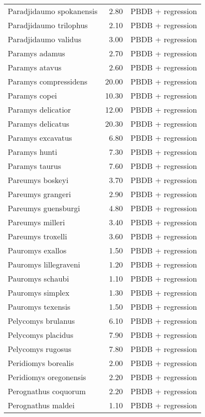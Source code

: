 \begin{table}[ht]
\begin{tabular}{lrl}
  Paradjidaumo spokanensis & 2.80 & PBDB + regression \\ 
  Paradjidaumo trilophus & 2.10 & PBDB + regression \\ 
  Paradjidaumo validus & 3.00 & PBDB + regression \\ 
  Paramys adamus & 2.70 & PBDB + regression \\ 
  Paramys atavus & 2.60 & PBDB + regression \\ 
  Paramys compressidens & 20.00 & PBDB + regression \\ 
  Paramys copei & 10.30 & PBDB + regression \\ 
  Paramys delicatior & 12.00 & PBDB + regression \\ 
  Paramys delicatus & 20.30 & PBDB + regression \\ 
  Paramys excavatus & 6.80 & PBDB + regression \\ 
  Paramys hunti & 7.30 & PBDB + regression \\ 
  Paramys taurus & 7.60 & PBDB + regression \\ 
  Pareumys boskeyi & 3.70 & PBDB + regression \\ 
  Pareumys grangeri & 2.90 & PBDB + regression \\ 
  Pareumys guensburgi & 4.80 & PBDB + regression \\ 
  Pareumys milleri & 3.40 & PBDB + regression \\ 
  Pareumys troxelli & 3.60 & PBDB + regression \\ 
  Pauromys exallos & 1.50 & PBDB + regression \\ 
  Pauromys lillegraveni & 1.20 & PBDB + regression \\ 
  Pauromys schaubi & 1.10 & PBDB + regression \\ 
  Pauromys simplex & 1.30 & PBDB + regression \\ 
  Pauromys texensis & 1.50 & PBDB + regression \\ 
  Pelycomys brulanus & 6.10 & PBDB + regression \\ 
  Pelycomys placidus & 7.90 & PBDB + regression \\ 
  Pelycomys rugosus & 7.80 & PBDB + regression \\ 
  Peridiomys borealis & 2.00 & PBDB + regression \\ 
  Peridiomys oregonensis & 2.20 & PBDB + regression \\ 
  Perognathus coquorum & 2.20 & PBDB + regression \\ 
  Perognathus maldei & 1.10 & PBDB + regression \\ 

\end{tabular}
\end{table}
